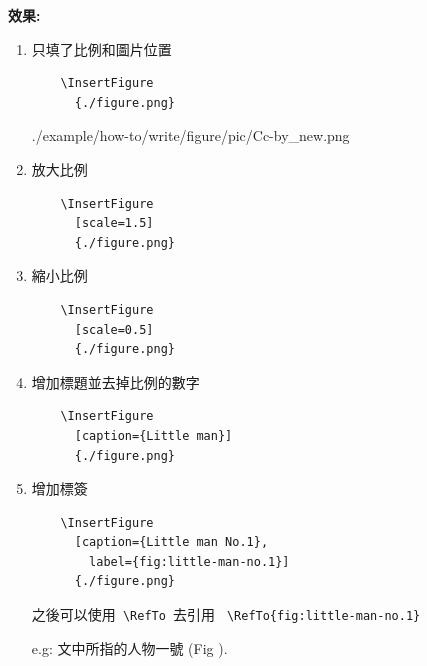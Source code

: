   \newpage
  {\bf 效果:}
  \begin{enumerate}
  \item
  {
    只填了比例和圖片位置
    \begin{verbatim}
    \InsertFigure
      {./figure.png}
    \end{verbatim}
    \InsertFigure
      {./example/how-to/write/figure/pic/Cc-by_new.png}
  } %

  \item
  {
    放大比例
    \begin{verbatim}
    \InsertFigure
      [scale=1.5]
      {./figure.png}
    \end{verbatim}
  } %

  \item
  {
    縮小比例
    \begin{verbatim}
    \InsertFigure
      [scale=0.5]
      {./figure.png}
    \end{verbatim}
  } %

  \newpage
  \item
  {
    增加標題並去掉比例的數字
    \begin{verbatim}
    \InsertFigure
      [caption={Little man}]
      {./figure.png}
    \end{verbatim}
  } %

  \item
  {
    增加標簽
    \begin{verbatim}
    \InsertFigure
      [caption={Little man No.1},
        label={fig:little-man-no.1}]
      {./figure.png}
    \end{verbatim}

    之後可以使用\verb| \RefTo |去引用 \verb| \RefTo{fig:little-man-no.1} |

    e.g: 文中所指的人物一號 (Fig ).
  } %


\end{enumerate}
